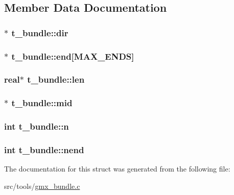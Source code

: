 \subsection{\-Member \-Data \-Documentation}
\hypertarget{structt__bundle_ace6892cb92fc936d3d3ee730838e67ca}{
\subsubsection[{dir}]{$\ast$ {\bf t\-\_\-bundle\-::dir}}}\label{structt__bundle_ace6892cb92fc936d3d3ee730838e67ca}
\hypertarget{structt__bundle_a3226b904719767ec53c2afa216920660}{
\subsubsection[{end}]{$\ast$ {\bf t\-\_\-bundle\-::end}\mbox{[}{\bf \-M\-A\-X\-\_\-\-E\-N\-D\-S}\mbox{]}}}\label{structt__bundle_a3226b904719767ec53c2afa216920660}
\hypertarget{structt__bundle_a4c057b243caa2cb07af8ce886e6d3fcc}{
\subsubsection[{len}]{\setlength{\rightskip}{0pt plus 5cm}real$\ast$ {\bf t\-\_\-bundle\-::len}}}\label{structt__bundle_a4c057b243caa2cb07af8ce886e6d3fcc}
\hypertarget{structt__bundle_a129bf541e14658ff99557f91ccfbea84}{
\subsubsection[{mid}]{$\ast$ {\bf t\-\_\-bundle\-::mid}}}\label{structt__bundle_a129bf541e14658ff99557f91ccfbea84}
\hypertarget{structt__bundle_ac1e205d5efd122bdcfa79e7ec10f8e5f}{
\subsubsection[{n}]{\setlength{\rightskip}{0pt plus 5cm}int {\bf t\-\_\-bundle\-::n}}}\label{structt__bundle_ac1e205d5efd122bdcfa79e7ec10f8e5f}
\hypertarget{structt__bundle_a854e3f8c8e574ac252fb8d10f9cdc4e8}{
\subsubsection[{nend}]{\setlength{\rightskip}{0pt plus 5cm}int {\bf t\-\_\-bundle\-::nend}}}\label{structt__bundle_a854e3f8c8e574ac252fb8d10f9cdc4e8}


\-The documentation for this struct was generated from the following file\-:\begin{DoxyCompactItemize}
\item 
src/tools/\hyperlink{gmx__bundle_8c}{gmx\-\_\-bundle.\-c}\end{DoxyCompactItemize}
